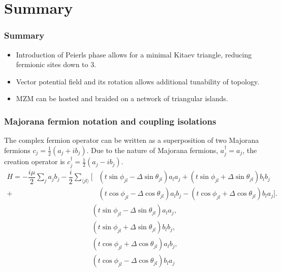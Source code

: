 \documentclass[xcolor=dvipsnames,10pt,aspectratio=169]{beamer}
\newcommand{\cc}{c^{\dagger}}
\newcommand{\de}{\Delta}
\newcommand{\CO}{Summary}
\begin{document}
  \section{\CO}
  \begin{frame}
    \frametitle{Summary}

    \begin{itemize}
      \item Introduction of Peierls phase allows for a minimal Kitaev triangle, reducing fermionic sites down to 3.
      \item Vector potential field and its rotation allows additional tunability of topology.
      \item MZM can be hosted and braided on a network of triangular islands.
    \end{itemize}
  \end{frame}

  \appendix

  \begin{frame}
  \frametitle{Majorana fermion notation and coupling isolations}
    The complex fermion operator can be written as a superposition of two Majorana fermions $c_j = \frac{1}{2} (a_j + i b_j)$.
    Due to the nature of Majorana fermions, $a^{\dagger}_j = a_j$, the creation operator is $\cc_j = \frac{1}{2} (a_j - i b_j)$.
    \begin{align*}
      H = -\dfrac{i\mu}{2} \sum_j a_j b_j - \dfrac{i}{2} \sum_{\langle jl\rangle} [&(t\sin\phi_{jl}-\de\sin\theta_{jl}) a_l a_j + (t\sin\phi_{jl}+\de\sin\theta_{jl}) b_l b_j \nonumber \\
      +&(t\cos\phi_{jl}-\de\cos\theta_{jl}) a_l b_j - (t\cos\phi_{jl}+\de\cos\theta_{jl}) b_l a_j].
    \end{align*}
    \begin{align}
      &(t \sin\phi_{jl} - \de \sin\theta_{jl}) a_l a_j, \\
      &(t \sin\phi_{jl} + \de \sin\theta_{jl}) b_l b_j, \\
      &(t \cos\phi_{jl} + \de \cos\theta_{jl}) a_l b_j, \\
      &(t \cos\phi_{jl} - \de \cos\theta_{jl}) b_l a_j
    \end{align}
  \end{frame}
\end{document}
